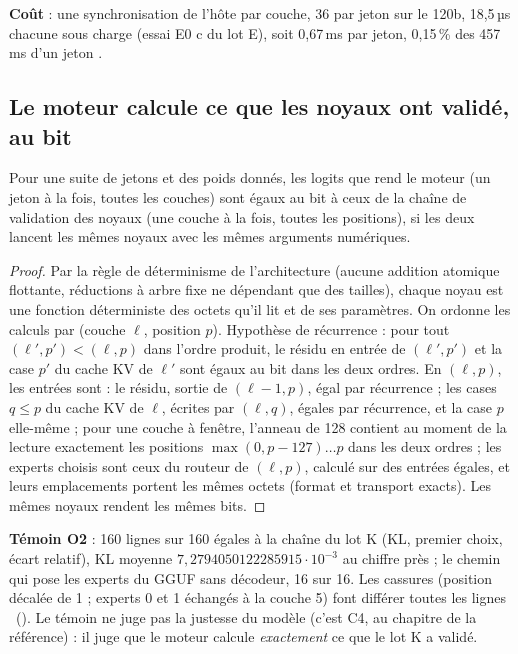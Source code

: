\textbf{Coût} : une synchronisation de l'hôte par couche, 36 par jeton sur le 120b, 18,5\,µs chacune sous charge (essai E0 c du lot E), soit 0,67\,ms par jeton, 0,15\,\% des 457\,ms d'un jeton \calc.

\subsection{Le moteur calcule ce que les noyaux ont validé, au bit}

\begin{proposition}\label{prop:t2o-ordre-calcul}
Pour une suite de jetons et des poids donnés, les logits que rend le moteur (un jeton à la fois, toutes les couches) sont égaux au bit à ceux de la chaîne de validation des noyaux (une couche à la fois, toutes les positions), si les deux lancent les mêmes noyaux avec les mêmes arguments numériques.
\end{proposition}

\begin{proof}
Par la règle de déterminisme de l'architecture (aucune addition atomique flottante, réductions à arbre fixe ne dépendant que des tailles), chaque noyau est une fonction déterministe des octets qu'il lit et de ses paramètres. On ordonne les calculs par (couche $\ell$, position $p$). Hypothèse de récurrence : pour tout $(\ell', p') < (\ell, p)$ dans l'ordre produit, le résidu en entrée de $(\ell', p')$ et la case $p'$ du cache KV de $\ell'$ sont égaux au bit dans les deux ordres. En $(\ell, p)$, les entrées sont : le résidu, sortie de $(\ell - 1, p)$, égal par récurrence ; les cases $q \le p$ du cache KV de $\ell$, écrites par $(\ell, q)$, égales par récurrence, et la case $p$ elle-même ; pour une couche à fenêtre, l'anneau de 128 contient au moment de la lecture exactement les positions $\max(0, p - 127) \ldots p$ dans les deux ordres ; les experts choisis sont ceux du routeur de $(\ell, p)$, calculé sur des entrées égales, et leurs emplacements portent les mêmes octets (format et transport exacts). Les mêmes noyaux rendent les mêmes bits.
\end{proof}

\textbf{Témoin O2} : 160 lignes sur 160 égales à la chaîne du lot K (KL, premier choix, écart relatif), KL moyenne $7{,}2794050122285915\cdot10^{-3}$ au chiffre près ; le chemin qui pose les experts du GGUF sans décodeur, 16 sur 16. Les cassures (position décalée de 1 ; experts 0 et 1 échangés à la couche 5) font différer toutes les lignes \mes~(). Le témoin ne juge pas la justesse du modèle (c'est C4, au chapitre de la référence) : il juge que le moteur calcule \emph{exactement} ce que le lot K a validé.

